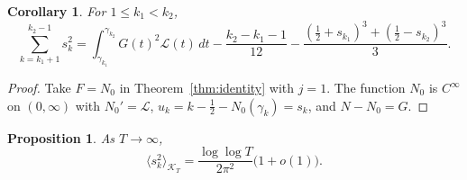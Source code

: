 \documentclass[11pt,a4paper]{article}
\makeatletter
\numberwithin{equation}{section}
\DeclareRobustCommand{\CGref}[1]{\ref{#1}}
\let\CG@origref\ref
\newcommand{\CG@gettip}[1]{\@ifundefined{CGTip@#1}{#1}{\csname CGTip@#1\endcsname}}
\DeclareRobustCommand{\CGref}[1]{\pdftooltip{\CG@origref{#1}}{\CG@gettip{#1}}}
\newtheorem{proposition}[theorem]{Proposition}
\newtheorem{corollary}[theorem]{Corollary}
\theoremstyle{definition}
\theoremstyle{remark}
\newcommand{\Nz}{N_0} %
\newcommand{\lL}{\mathcal L}
\newcommand{\Kc}{\mathcal K}
\makeatother
\begin{document}
\begin{corollary}\label{cor:identity_clock}
For $1\le k_1<k_2$,
\begin{equation}
\sum_{k=k_1+1}^{k_2-1}s_k^2=\int_{\gamma_{k_1}}^{\gamma_{k_2}}G(t)^2\lL(t)\,dt-\frac{k_2-k_1-1}{12}-\frac{(\frac12+s_{k_1})^3+(\frac12-s_{k_2})^3}3 .
\label{eq:identity_clock}
\end{equation}
\end{corollary}

\begin{proof}
Take $F=\Nz$ in Theorem~\CGref{thm:identity} with $j=1$. The function $\Nz$ is $C^\infty$ on $(0,\infty)$ with $\Nz'=\lL$, $u_k=k-\frac12-\Nz(\gamma_k)=s_k$, and $N-\Nz=G$.
\end{proof}

\begin{proposition}\label{prop:s_meansquare}
As $T\to\infty$,
\begin{equation}
\langle s_k^2\rangle_{\Kc_T}=\frac{\log\log T}{2\pi^2}\bigl(1+o(1)\bigr).
\label{eq:s_meansquare}
\end{equation}
\end{proposition}
\end{document}
